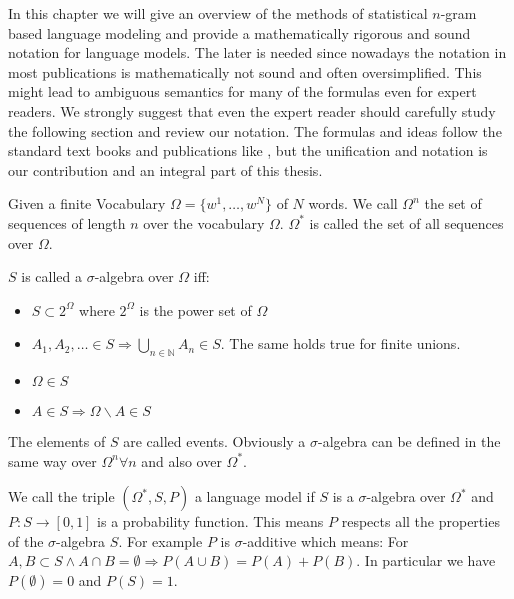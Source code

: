\documentclass[•]{book}
\begin{document}
In this chapter we will give an overview of the methods of statistical $n$-gram based language modeling and provide a mathematically rigorous and sound notation for language models.
The later is needed since nowadays the notation in most publications is mathematically not sound and often oversimplified.
This might lead to ambiguous semantics for many of the formulas even for expert readers. 
We strongly suggest that even the expert reader should carefully study the following section and review our notation. 
The formulas and ideas follow the standard text books and publications like \cite{chen:goodman},  but the unification and notation is our contribution and an integral part of this thesis. 

Given a finite Vocabulary $\Omega = \{w^1,\dots,w^N\}$ of $N$ words. 
We call $\Omega^{n}$ the set of sequences of length $n$ over the vocabulary $\Omega$.
$\Omega^{*}$ is called the set of all sequences over $\Omega$.
\begin{definition}\label{def:sa}
$S$ is called a $\sigma$-algebra over $\Omega$ iff:

\begin{itemize}
\item $S\subset 2^{\Omega}$ where $2^{\Omega}$ is the power set of $\Omega$  \eqnum
\item $A_1,A_2,\dots \in S \Rightarrow \bigcup_{n\in\mathbb{N}}A_n \in S$. The same holds true for finite unions. 
\item $\Omega \in S$ \eqnum
\item $A\in S \Rightarrow \Omega\backslash A \in S$ \eqnum
\end{itemize}

\end{definition}
The elements of $S$ are called events.
Obviously a $\sigma$-algebra can be defined in the same way over $\Omega^{n} \forall n$ and also over $\Omega^{*}$. 

\begin{definition}\label{def:pf}We call the triple $(\Omega^{*}, S, P)$ a language model if $S$ is a $\sigma$-algebra over $\Omega^{*}$ and $P:S\longrightarrow [0,1]$ is a probability function.  
This means $P$ respects all the properties of the $\sigma$-algebra $S$. 
For example $P$ is $\sigma$-additive which means: 
For $A,B \subset S \land A\cap B = \emptyset \Rightarrow P(A\cup B) = P(A)+P(B)$. 
In particular we have $P(\emptyset)=0$ and $P(S)=1$. 
\end{definition} 
\end{document}
